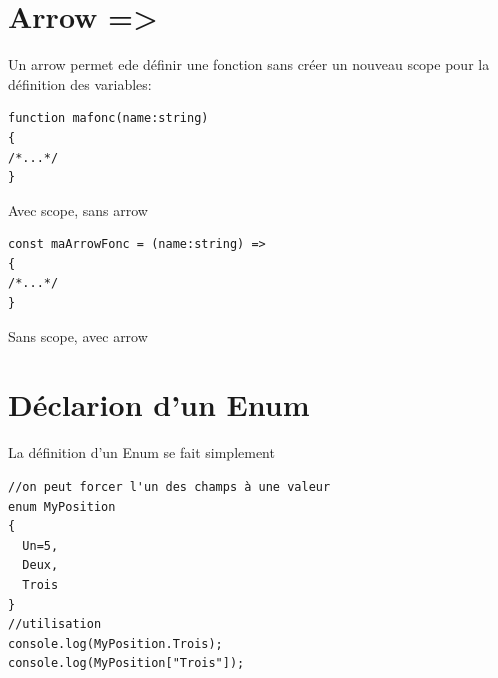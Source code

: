 \documentclass[12pt,oneside]{scrbook}
\begin{document}
\section{Arrow =>}
Un arrow permet ede définir une fonction sans créer un nouveau scope pour la définition des variables:
\begin{listing}[ht]
\begin{verbatim}
function mafonc(name:string)
{
/*...*/
}
\end{verbatim}
\caption{Avec scope, sans arrow}
\label{listing:0}
\end{listing}
\begin{listing}[ht]
\begin{verbatim}
const maArrowFonc = (name:string) =>
{
/*...*/
}
\end{verbatim}
\caption{Sans scope, avec arrow}
\label{listing:0}
\end{listing}


\section{Déclarion d'un Enum}
La définition d'un Enum se fait simplement
\begin{verbatim}
//on peut forcer l'un des champs à une valeur
enum MyPosition
{
  Un=5,
  Deux,
  Trois
}
//utilisation
console.log(MyPosition.Trois);
console.log(MyPosition["Trois"]);
\end{verbatim}


\end{document}
